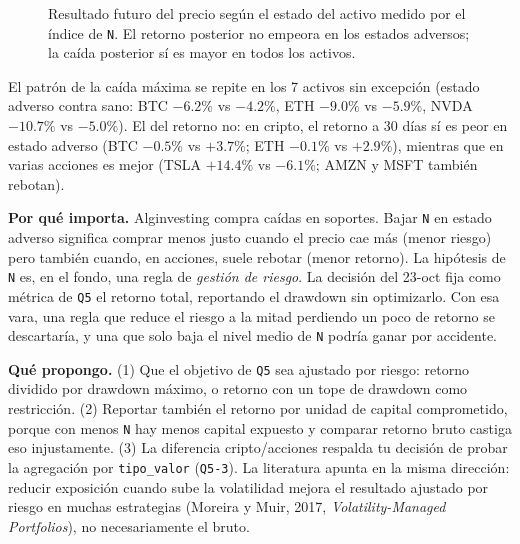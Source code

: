 \documentclass[11pt,a4paper]{article}
\newcommand{\code}[1]{\texttt{\small #1}}
\begin{document}
\begin{figure}[h]
\centering
{}
\caption{Resultado futuro del precio según el estado del activo medido por el índice de \code{N}. El
retorno posterior no empeora en los estados adversos; la caída posterior sí es mayor en todos los activos.}
\label{fig:riesgo}
\end{figure}

El patrón de la caída máxima se repite en los 7 activos sin excepción (estado adverso contra sano: BTC
$-6.2\%$ vs $-4.2\%$, ETH $-9.0\%$ vs $-5.9\%$, NVDA $-10.7\%$ vs $-5.0\%$). El del retorno no: en
cripto, el retorno a 30 días sí es peor en estado adverso (BTC $-0.5\%$ vs $+3.7\%$; ETH $-0.1\%$ vs
$+2.9\%$), mientras que en varias acciones es mejor (TSLA $+14.4\%$ vs $-6.1\%$; AMZN y MSFT también
rebotan).

\textbf{Por qué importa.} Alginvesting compra caídas en soportes. Bajar \code{N} en estado adverso
significa comprar menos justo cuando el precio cae más (menor riesgo) pero también cuando, en acciones,
suele rebotar (menor retorno). La hipótesis de \code{N} es, en el fondo, una regla de \emph{gestión de
riesgo}. La decisión del 23-oct fija como métrica de \code{Q5} el retorno total, reportando el drawdown
sin optimizarlo. Con esa vara, una regla que reduce el riesgo a la mitad perdiendo un poco de retorno
se descartaría, y una que solo baja el nivel medio de \code{N} podría ganar por accidente.

\textbf{Qué propongo.} (1) Que el objetivo de \code{Q5} sea ajustado por riesgo: retorno dividido por
drawdown máximo, o retorno con un tope de drawdown como restricción. (2) Reportar también el retorno por
unidad de capital comprometido, porque con menos \code{N} hay menos capital expuesto y comparar retorno
bruto castiga eso injustamente. (3) La diferencia cripto/acciones respalda tu decisión de probar la
agregación por \code{tipo\_valor} (\code{Q5-3}). La literatura apunta en la misma dirección: reducir
exposición cuando sube la volatilidad mejora el resultado ajustado por riesgo en muchas estrategias
(Moreira y Muir, 2017, \emph{Volatility-Managed Portfolios}), no necesariamente el bruto.
\end{document}
